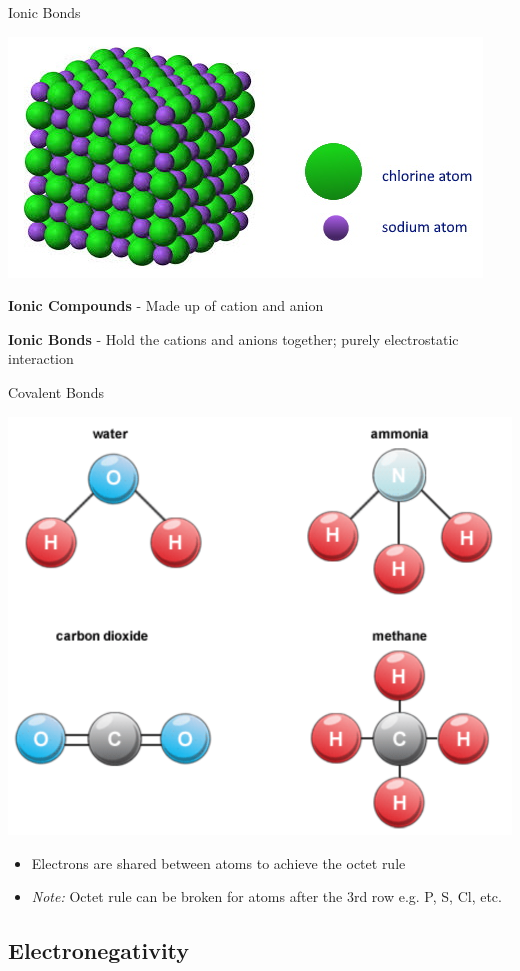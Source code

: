\documentclass[11pt]{beamer}
\begin{document}
\begin{frame}{Ionic Bonds}
  \begin{center}
    \includegraphics[width=0.6\linewidth]{nacl}
  \end{center}
  
  \textbf{Ionic Compounds} - Made up of cation and anion

  \textbf{Ionic Bonds} - Hold the cations and anions together;
  purely electrostatic interaction

\end{frame}

\begin{frame}{Covalent Bonds}
  \begin{center}
    \includegraphics[width=0.6\linewidth]{molec_example}
  \end{center}
  \begin{itemize}
  \item Electrons are shared between atoms to achieve
    the octet rule
  \item \textit{Note:} Octet rule can be broken for atoms
    after the 3rd row e.g. P, S, Cl, etc.
  \end{itemize}
\end{frame}

\subsection{Electronegativity}
\end{document}
